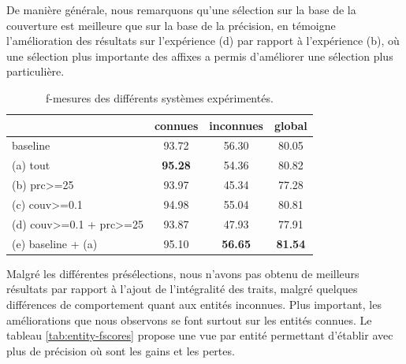 \documentclass[12pt,a4paper,times,twoside,openright]{report}
\begin{document}
De manière générale, nous remarquons qu'une sélection sur la base de la couverture est meilleure que sur la base de la précision, en témoigne l'amélioration des résultats sur l'expérience (d) par rapport à l'expérience (b), où une sélection plus importante des affixes a permis d'améliorer une sélection plus particulière.

\begin{table}[ht!]
\centering
\begin{tabular}{|l|ccc|}
\cline{2-4}
\multicolumn{1}{l|}{}   & connues        & inconnues      & global \\
\hline
baseline                & 93.72          & 56.30          & 80.05 \\
\hline
(a) tout                & \textbf{95.28} & 54.36          & 80.82 \\
\hline
(b) prc>=25             & 93.97          & 45.34          & 77.28 \\
(c) couv>=0.1           & 94.98          & 55.04          & 80.81 \\
(d) couv>=0.1 + prc>=25 & 93.87          & 47.93          & 77.91 \\
\hline
(e) baseline + (a)          & 95.10          & \textbf{56.65} & \textbf{81.54} \\
\hline
\end{tabular}
\caption{f-mesures des différents systèmes expérimentés.}
\label{tab:fscores}
\end{table}

Malgré les différentes présélections, nous n'avons pas obtenu de meilleurs résultats par rapport à l'ajout de l'intégralité des traits, malgré quelques différences de comportement quant aux entités inconnues. Plus important, les améliorations que nous observons se font surtout sur les entités connues. Le tableau \ref{tab:entity-fscores} propose une vue par entité permettant d'établir avec plus de précision où sont les gains et les pertes.
\end{document}
